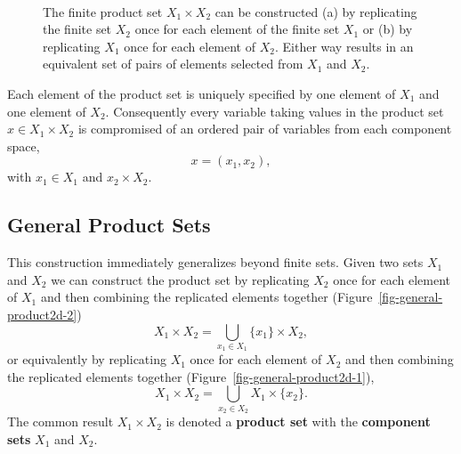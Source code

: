 \documentclass[
  letterpaper,
  DIV=11,
  numbers=noendperiod]{scrartcl}
\begin{document}
\begin{figure}
\begin{minipage}[t]{0.90\linewidth}
\subcaption{\label{fig-finite-product1}}
\end{minipage}%
%
\begin{minipage}[t]{0.05\linewidth}

{\centering 

~

}

\end{minipage}%

\caption{\label{fig-finite-product}The finite product set
\(X_{1} \times X_{2}\) can be constructed (a) by replicating the finite
set \(X_{2}\) once for each element of the finite set \(X_{1}\) or (b)
by replicating \(X_{1}\) once for each element of \(X_{2}\). Either way
results in an equivalent set of pairs of elements selected from
\(X_{1}\) and \(X_{2}\).}

\end{figure}

Each element of the product set is uniquely specified by one element of
\(X_{1}\) and one element of \(X_{2}\). Consequently every variable
taking values in the product set \(x \in X_{1} \times X_{2}\) is
compromised of an ordered pair of variables from each component space,
\[
x = (x_{1}, x_{2}),
\] with \(x_{1} \in X_{1}\) and \(x_{2} \times X_{2}\).

\hypertarget{general-product-sets}{%
\subsection{General Product Sets}\label{general-product-sets}}

This construction immediately generalizes beyond finite sets. Given two
sets \(X_{1}\) and \(X_{2}\) we can construct the product set by
replicating \(X_{2}\) once for each element of \(X_{1}\) and then
combining the replicated elements together
(Figure~\ref{fig-general-product2d-2}) \[
X_{1} \times X_{2} = \bigcup_{x_{1} \in X_{1}} \{ x_{1} \} \times X_{2},
\] or equivalently by replicating \(X_{1}\) once for each element of
\(X_{2}\) and then combining the replicated elements together
(Figure~\ref{fig-general-product2d-1}), \[
X_{1} \times X_{2} = \bigcup_{x_{2} \in X_{2}} X_{1} \times \{ x_{2} \}.
\] The common result \(X_{1} \times X_{2}\) is denoted a \textbf{product
set} with the \textbf{component sets} \(X_{1}\) and \(X_{2}\).
\end{document}
